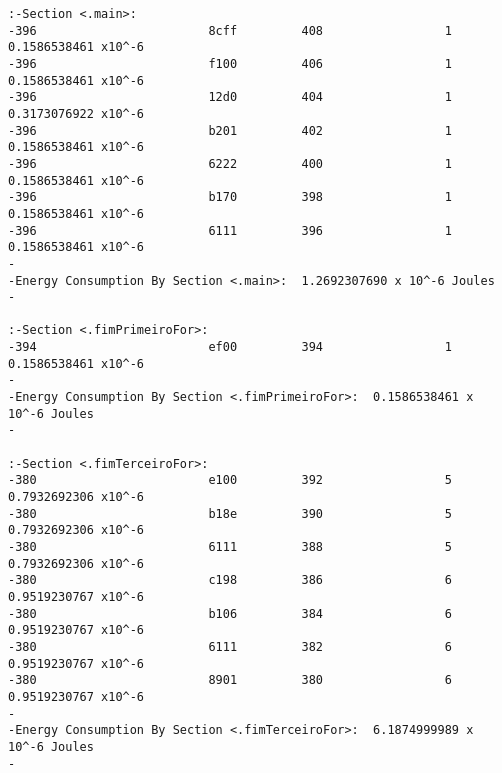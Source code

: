 \begin{verbatim}
:-Section <.main>:  
-396                        8cff         408                 1              0.1586538461 x10^-6 
-396                        f100         406                 1              0.1586538461 x10^-6 
-396                        12d0         404                 1              0.3173076922 x10^-6 
-396                        b201         402                 1              0.1586538461 x10^-6 
-396                        6222         400                 1              0.1586538461 x10^-6 
-396                        b170         398                 1              0.1586538461 x10^-6 
-396                        6111         396                 1              0.1586538461 x10^-6 
-                                                                                          
-Energy Consumption By Section <.main>:  1.2692307690 x 10^-6 Joules
-                                                                                          

:-Section <.fimPrimeiroFor>:  
-394                        ef00         394                 1              0.1586538461 x10^-6 
-                                                                                          
-Energy Consumption By Section <.fimPrimeiroFor>:  0.1586538461 x 10^-6 Joules
-                                                                                          

:-Section <.fimTerceiroFor>:  
-380                        e100         392                 5              0.7932692306 x10^-6 
-380                        b18e         390                 5              0.7932692306 x10^-6 
-380                        6111         388                 5              0.7932692306 x10^-6 
-380                        c198         386                 6              0.9519230767 x10^-6 
-380                        b106         384                 6              0.9519230767 x10^-6 
-380                        6111         382                 6              0.9519230767 x10^-6 
-380                        8901         380                 6              0.9519230767 x10^-6 
-                                                                                          
-Energy Consumption By Section <.fimTerceiroFor>:  6.1874999989 x 10^-6 Joules
-                                                                                          


\end{verbatim}
